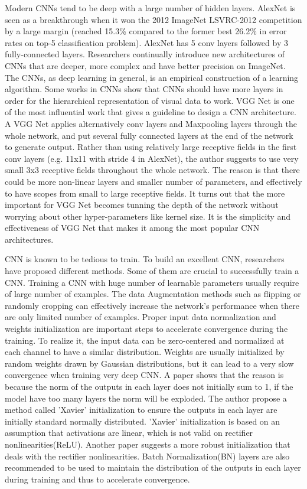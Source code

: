 Modern CNNs tend to be deep with a large number of hidden layers. AlexNet is seen as a breakthrough when it won the 2012 ImageNet LSVRC-2012 competition by a large margin (reached 15.3\% compared to the former best 26.2\% in error rates on top-5 classification problem). AlexNet has 5 conv layers followed by 3 fully-connected layers. Researchers continually introduce new architectures of CNNs that are deeper, more complex and have better precision on ImageNet. The CNNs, as deep learning in general, is an empirical construction of a learning algorithm. Some works in CNNs show that CNNs should have more layers in order for the hierarchical representation of visual data to work\cite{he2016deep}. VGG Net\cite{simonyan2014very} is one of the most influential work that gives a guideline to design a CNN architecture. A VGG Net applies alternatively conv layers and Maxpooling layers through the whole network, and put several fully connected layers at the end of the network to generate output. Rather than using relatively large receptive fields in the first conv layers (e.g. 11x11 with stride 4 in AlexNet\cite{krizhevsky2012imagenet}), the author suggests to use very small 3x3 receptive fields throughout the whole network. The reason is that there could be more non-linear layers and smaller number of parameters, and effectively to have scopes from small to large receptive fields. It turns out that the more important for VGG Net becomes tunning the depth of the network without worrying about other hyper-parameters like kernel size. It is the simplicity and effectiveness of VGG Net that makes it among the most popular CNN architectures. 

CNN is known to be tedious to train. To build an excellent CNN, researchers have proposed different methods. Some of them are crucial to successfully train a CNN. Training a CNN with huge number of learnable parameters usually require of large number of examples. The data Augmentation methods such as flipping or randomly cropping can effectively increase the network's performance when there are only limited number of examples. Proper input data normalization and weights initialization are important steps to accelerate convergence during the training. To realize it, the input data can be zero-centered and normalized at each channel to have a similar distribution. Weights are usually initialized by random weights drawn by Gaussian distributions\cite{krizhevsky2012imagenet}, but it can lead to a very slow convergence when training very deep CNN. A paper\cite{glorot2010understanding} shows that the reason is because the norm of the outputs in each layer does not initially sum to 1, if the model have too many layers the norm will be exploded. The author propose a method called 'Xavier' initialization to ensure the outputs in each layer are initially standard normally distributed. 'Xavier' initialization is based on an assumption that activations are linear, which is not valid on rectifier nonlinearities(ReLU). Another paper\cite{he2015delving} suggests a more robust initialization that deals with the rectifier nonlinearities. Batch Normalization(BN) layers are also recommended to be used to maintain the distribution of the outputs in each layer during training and thus to accelerate convergence\cite{krizhevsky2012imagenet}. 


